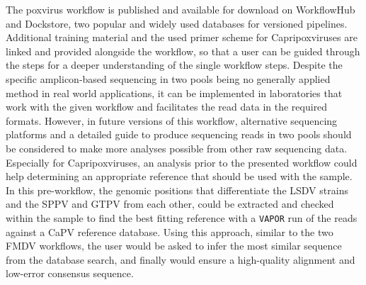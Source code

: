 The poxvirus workflow is published and available for download on WorkflowHub and Dockstore, two popular and widely used databases for versioned pipelines. Additional training material and the used primer scheme for Capripoxviruses are linked and provided alongside the workflow, so that a user can be guided through the steps for a deeper understanding of the single workflow steps. Despite the specific amplicon-based sequencing in two pools being no generally applied method in real world applications, it can be implemented in laboratories that work with the given workflow and facilitates the read data in the required formats. However, in future versions of this workflow, alternative sequencing platforms and a detailed guide to produce sequencing reads in two pools should be considered to make more analyses possible from other raw sequencing data. Especially for Capripoxviruses, an analysis prior to the presented workflow could help determining an appropriate reference that should be used with the sample. In this pre-workflow, the genomic positions that differentiate the \ac{LSDV} strains and the \ac{SPPV} and \ac{GTPV} from each other, could be extracted and checked within the sample to find the best fitting reference with a \texttt{VAPOR} run of the reads against a \ac{CaPV} reference database. Using this approach, similar to the two \ac{FMDV} workflows, the user would be asked to infer the most similar sequence from the database search, and finally would ensure a high-quality alignment and low-error consensus sequence.

